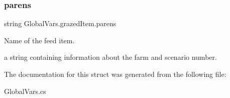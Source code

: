 \subsubsection{\texorpdfstring{parens}{parens}}
{\footnotesize\ttfamily string Global\+Vars.\+grazed\+Item.\+parens}



Name of the feed item. 

a string containing information about the farm and scenario number. 

The documentation for this struct was generated from the following file\+:\begin{DoxyCompactItemize}
\item 
Global\+Vars.\+cs\end{DoxyCompactItemize}
